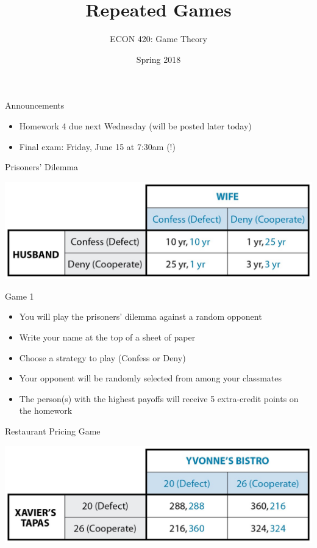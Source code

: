 \documentclass[10pt]{beamer}
\author{ECON 420: Game Theory}
\date{Spring 2018}
\title{Repeated Games}
\begin{document}
\maketitle

\begin{frame}[label={sec:org2a3ee08}]{}
\alert{Announcements}
\begin{itemize}
\item Homework 4 due next Wednesday (will be posted later today)
\item Final exam: Friday, June 15 at 7:30am (!)
\end{itemize}
\end{frame}

\begin{frame}[label={sec:org85b3298}]{Prisoners' Dilemma}
\begin{center}
\includegraphics[width=.75\textwidth]{./img/GAMES4_FIG10.01.jpg}
\end{center}
\end{frame}

\begin{frame}[label={sec:org537aded}]{}
\alert{Game 1}
\begin{itemize}
\item You will play the prisoners' dilemma against a random opponent
\item Write your name at the top of a sheet of paper
\item Choose a strategy to play (Confess or Deny)
\item Your opponent will be randomly selected from among your classmates
\item The person(s) with the highest payoffs will receive 5 extra-credit points on the homework
\end{itemize}
\end{frame}

\begin{frame}[label={sec:org4a52643}]{Restaurant Pricing Game}
\begin{center}
\includegraphics[width=.75\textwidth]{./img/GAMES4_FIG10.02.jpg}
\end{center}
\end{frame}
\end{document}
